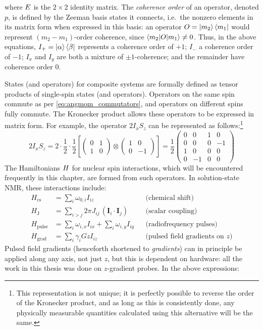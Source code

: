 where $E\/$ is the $2 \times 2$ identity matrix.
The \textit{coherence order} of an operator, denoted $p$, is defined by the Zeeman basis states it connects, i.e.\ the nonzero elements in its matrix form when expressed in this basis: an operator $O = \ket{m_2}\bra{m_1}$ would represent $(m_2 - m_1)$-order coherence, since $\braket{m_2|O|m_1} \neq 0$.
Thus, in the above equations, $I_+ = \ket{\alpha}\bra{\beta}$ represents a coherence order of $+1$; $I_-$ a coherence order of $-1$; $I_x$ and $I_y$ are both a mixture of $\pm 1$-coherence; and the remainder have coherence order $0$.

States (and operators) for composite systems are formally defined as tensor products of single-spin states (and operators)\autocite{Sakurai2021}.
Operators on the same spin commute as per \cref{eq:angmom_commutators}, and operators on different spins fully commute.
The Kronecker product allows these operators to be expressed in matrix form.\autocite{Hore2015}
For example, the operator $2I_xS_z$ can be represented as follows:\footnote{This representation is not unique; it is perfectly possible to reverse the order of the Kronecker product, and as long as this is consistently done, any physically measurable quantities calculated using this alternative will be the same.}
\begin{equation}
    \label{eq:composite_operator}
    2I_xS_z = 2 \cdot \frac{1}{2} \cdot \frac{1}{2} \left[ 
    \begin{pmatrix} 0 & 1 \\ 1 & 0 \end{pmatrix} \otimes
    \begin{pmatrix} 1 & 0 \\ 0 & -1 \end{pmatrix} \right]
    = \frac{1}{2} \begin{pmatrix} 0 & 0 & 1 & 0 \\ 0 & 0 & 0 & -1 \\ 1 & 0 & 0 & 0 \\ 0 & -1 & 0 & 0 \end{pmatrix}
\end{equation}
The Hamiltonians $H\/$ for nuclear spin interactions, which will be encountered frequently in this chapter, are formed from such operators.\autocite{Levitt2008}
In solution-state NMR, these interactions include:
\begin{align}
    H_\text{cs} &= \sum_i \omega_{0,i} I_{iz} & &\text{(chemical shift)} \label{eq:h_cs} \\
    H_\text{J} &= \sum_{i > j} 2\pi J_{ij} \,(\symbf{I}_{i}\cdot \symbf{I}_{j}) & &\text{(scalar coupling)} \label{eq:h_j} \\
    H_\text{pulse} &= \sum_i \omega_{i,x}I_{ix} + \sum_i \omega_{i,y}I_{iy} & &\text{(radiofrequency pulses)} \label{eq:h_pulse} \\
    H_\text{grad} &= \sum_i \gamma_i Gz I_{iz} & &\text{(pulsed field gradients on }z\text{)} \label{eq:h_grad}
\end{align}
Pulsed field gradients (henceforth shortened to \textit{gradients}) can in principle be applied along any axis, not just $z$, but this is dependent on hardware: all the work in this thesis was done on $z$-gradient probes.
In the above expressions:

